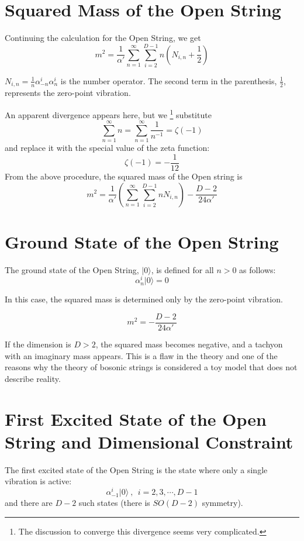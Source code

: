 \documentclass[uplatex]{jsarticle}
\begin{document}
\section{Squared Mass of the Open String}

Continuing the calculation for the Open String, we get
$$
	m^{2}
	=
	\frac{1}{\alpha'}
	\sum^{\infty}_{n=1}
	\sum^{D-1}_{i=2}
	n
	\left(
	N_{i,n} + \frac{1}{2}
	\right)
$$

$N_{i,n}=\frac{1}{n} \alpha^{i}_{-n} \alpha^{i}_{n}$
is the number operator.
The second term in the parenthesis,
$\frac{1}{2}$,
represents the zero-point vibration.

An apparent divergence appears here, but we
\footnote{The discussion to converge this divergence seems very complicated.}
substitute
$$
	\sum^{\infty}_{n=1} n
	=
	\sum^{\infty}_{n=1}
	\frac{1}{n^{-1}}
	=
	\zeta(-1)
$$
and replace it with the special value of the zeta function:
$$
	\zeta(-1)
	=
	- \frac{1}{12}
$$
From the above procedure, the squared mass of the Open string is
$$
	m^{2}
	=
	\frac{1}{\alpha'}
	\left(
	\sum^{\infty}_{n=1}
	\sum^{D-1}_{i=2}
	n N_{i,n}
	\right)
	- \frac{D-2}{24 \alpha'}
$$

\section{Ground State of the Open String}

The ground state of the Open String,
$| 0 \rangle$,
is defined for all
$n>0$
as follows:
$$
	\alpha^{i}_{n}
	| 0 \rangle
	= 0
$$

In this case, the squared mass is determined only by the zero-point vibration.

$$
	m^{2}
	= - \frac{D-2}{24 \alpha'}
$$

If the dimension is
$D>2$,
the squared mass becomes negative, and a tachyon with an imaginary mass appears.
This is a flaw in the theory and one of the reasons why the theory of bosonic strings is considered a toy model that does not describe reality.

\section{First Excited State of the Open String and Dimensional Constraint}

The first excited state of the Open String is the state where only a single vibration is active:
$$
	\alpha^{i}_{-1}
	| 0 \rangle
	\ , \ \ i = 2,3,\cdots, D-1
$$
and there are
$D-2$
such states (there is
$SO(D-2)$
symmetry).
\end{document}
